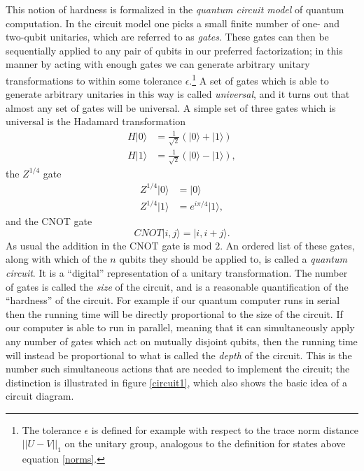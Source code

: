 \documentclass[12pt]{article}
\newcommand{\be}{\begin{equation}}
\newcommand{\ee}{\end{equation}}
\newcommand{\ran}{\rangle}
\begin{document}
This notion of hardness is formalized in the \textit{quantum circuit model} of quantum computation.  In the circuit model one picks a small finite number of one- and two-qubit unitaries, which are referred to as \textit{gates}.  These gates can then be sequentially applied to any pair of qubits in our preferred factorization; in this manner by acting with enough gates we can generate arbitrary unitary transformations to within some tolerance $\epsilon$.\footnote{The tolerance $\epsilon$ is defined for example with respect to the trace norm distance $||U-V||_1$ on the unitary group, analogous to the definition for states above equation \eqref{norms}.}  A set of gates which is able to generate arbitrary unitaries in this way is called \textit{universal}, and it turns out that almost any set of gates will be universal.  A simple set of three gates which is universal is the Hadamard transformation
\begin{align}\nonumber
H|0\ran&=\frac{1}{\sqrt{2}}\left(|0\ran+|1\ran\right)\\
H|1\ran&=\frac{1}{\sqrt{2}}\left(|0\ran-|1\ran\right),
\end{align}
the $Z^{1/4}$ gate
\begin{align}\nonumber
Z^{1/4}|0\ran&=|0\ran\\
Z^{1/4}|1\ran&=e^{i\pi/4}|1\ran,
\end{align}
and the CNOT gate
\be
CNOT|i,j\ran=|i,i+j\ran.
\ee
As usual the addition in the CNOT gate is mod $2$.  An ordered list of these gates, along with which of the $n$ qubits they should be applied to, is called a \textit{quantum circuit}.  It is a ``digital'' representation of a unitary transformation.  The number of gates is called the \textit{size} of the circuit, and is a reasonable quantification of the ``hardness'' of the circuit.  For example if our quantum computer runs in serial then the running time will be directly proportional to the size of the circuit.  If our computer is able to run in parallel, meaning that it can simultaneously apply any number of gates which act on mutually disjoint qubits, then the running time will instead be proportional to what is called the \textit{depth} of the circuit.  This is the number such simultaneous actions that are needed to implement the circuit; the distinction is illustrated in figure \ref{circuit1}, which also shows the basic idea of a circuit diagram.
\end{document}
